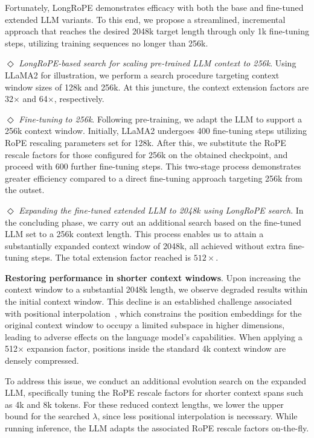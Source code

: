 Fortunately, LongRoPE demonstrates efficacy with both the base and fine-tuned extended LLM variants. To this end, we propose a streamlined, incremental approach that reaches the desired 2048k target length through only 1k fine-tuning steps, utilizing training sequences no longer than 256k.

$\Diamond$ \textit{LongRoPE-based search for scaling pre-trained LLM context to 256k}. Using LLaMA2 for illustration, we perform a search procedure targeting context window sizes of 128k and 256k. At this juncture, the context extension factors are 32$\times$ and 64$\times$, respectively.

$\Diamond$ \textit{Fine-tuning to 256k}. Following pre-training, we adapt the LLM to support a 256k context window. Initially, LLaMA2 undergoes 400 fine-tuning steps utilizing RoPE rescaling parameters set for 128k. After this, we substitute the RoPE rescale factors for those configured for 256k on the obtained checkpoint, and proceed with 600 further fine-tuning steps. This two-stage process demonstrates greater efficiency compared to a direct fine-tuning approach targeting 256k from the outset.

$\Diamond$ \textit{Expanding the fine-tuned extended LLM to 2048k using LongRoPE search}. In the concluding phase, we carry out an additional search based on the fine-tuned LLM set to a 256k context length. This process enables us to attain a substantially expanded context window of 2048k, all achieved without extra fine-tuning steps. The total extension factor reached is $512\times$.

\textbf{Restoring performance in shorter context windows}. Upon increasing the context window to a substantial 2048k length, we observe degraded results within the initial context window. This decline is an established challenge associated with positional interpolation~\cite{pi}, which constrains the position embeddings for the original context window to occupy a limited subspace in higher dimensions, leading to adverse effects on the language model's capabilities. When applying a 512$\times$ expansion factor, positions inside the standard 4k context window are densely compressed.

To address this issue, we conduct an additional evolution search on the expanded LLM, specifically tuning the RoPE rescale factors for shorter context spans such as 4k and 8k tokens. For these reduced context lengths, we lower the upper bound for the searched $\lambda$, since less positional interpolation is necessary. While running inference, the LLM adapts the associated RoPE rescale factors on-the-fly.

